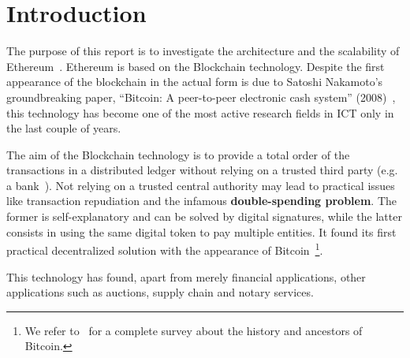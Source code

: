 \section{Introduction}

The purpose of this report is to investigate the architecture and the
scalability of Ethereum~\cite{wood2018ethereum}. Ethereum is based on the
Blockchain technology. Despite the first appearance of the blockchain in the
actual form is due to Satoshi Nakamoto's groundbreaking paper, ``Bitcoin: A
peer-to-peer electronic cash system'' (2008)~\cite{bib:bitcoin}, this technology
has become one of the most active research fields in ICT only in the last couple
of years.

The aim of the Blockchain technology is to provide a total order of the
transactions in a distributed ledger without relying on a trusted third party
(e.g. a bank~\cite{bib:the-quest}). Not relying on a trusted central authority
may lead to practical issues like transaction repudiation and the infamous
\textbf{double-spending problem}. The former is self-explanatory and can be
solved by digital signatures, while the latter consists in using the same
digital token to pay multiple entities. It found its first practical
decentralized solution with the appearance of
Bitcoin~\cite{ethereumwp}\footnote{We refer to~\cite{ethereumwp} for a complete
survey about the history and ancestors of Bitcoin.}.

This technology has found, apart from merely financial applications, other
applications such as auctions, supply chain and notary services.

